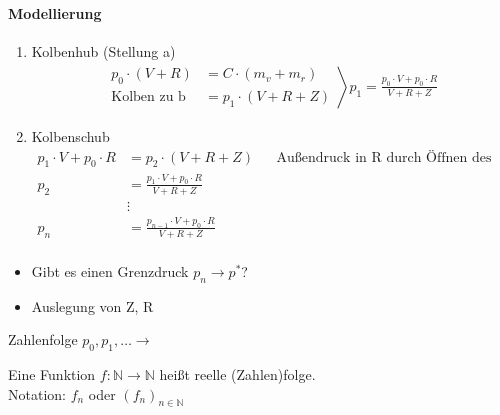 \begin{example}[Evakuierungspumpe]
\paragraph*{Modellierung}
\begin{enumerate}
	\item Kolbenhub (Stellung a)
	\begin{align*} \left.
		\begin{aligned}
			p_0 \cdot (V + R) &= C \cdot (m_v + m_r) \\
			\text{Kolben zu b} &= p_1 \cdot (V + R + Z)
		\end{aligned} \right\rangle
		p_1 = \frac{p_0 \cdot V + p_0 \cdot R}{V + R + Z}
	\end{align*}
	\item Kolbenschub
	\begin{align*}
	p_1 \cdot V + p_0 \cdot R &= p_2 \cdot (V + R + Z) && \text{Außendruck in R durch Öffnen des Ventils 1} \\
	p_2 &= \frac{p_1 \cdot V + p_0 \cdot R}{V + R + Z} \\
	&\vdots \\
	p_n &= \frac{p_{n-1} \cdot V + p_0 \cdot R}{V + R + Z} \\
	\end{align*}
\end{enumerate}
\begin{itemize} 
  \item Gibt es einen Grenzdruck $p_n \rightarrow p^*$?
  \item Auslegung von Z, R
\end{itemize}
Zahlenfolge $p_0, p_1, \ldots \rightarrow$

\end{example}

\begin{definition}[Zahlenfolge]
Eine Funktion $f: \mathbb N \rightarrow \mathbb N$ heißt reelle (Zahlen)folge.\\
Notation: $f_n$ oder $(f_n)_{n \in \mathbb N}$
\end{definition}


